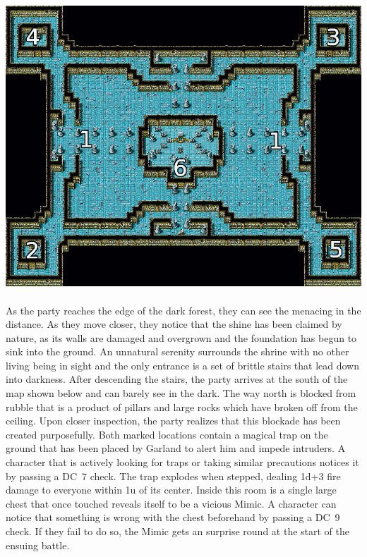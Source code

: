 %
\ofpar
%
\includegraphics[width=\columnwidth]{./art/chaosincornelia/shrine.jpg} 
%
\\\\
%
As the party reaches the edge of the dark forest, they can see the menacing  in the distance.
As they move closer, they notice that the shine has been claimed by nature, as its walls are damaged and overgrown and the foundation has begun to sink into the ground.
An unnatural serenity surrounds the shrine with no other living being in sight and the only entrance is a set of brittle stairs that lead down into darkness. 
After descending the stairs, the party arrives at the south of the map shown below and can barely see in the dark.
The way north is blocked from rubble that is a product of pillars and large rocks which have broken off from the ceiling.
Upon closer inspection, the party realizes that this blockade has been created purposefully.
%
\newpage
%
 Both marked locations contain a magical trap on the ground that has been placed by Garland to alert him and  impede intruders.
A character that is actively looking for traps or taking similar precautions notices it by passing a DC~7 check. 
The trap explodes when stepped, dealing 1d+3 fire damage to everyone within 1u of its center. 
%
\ofpar
%
 Inside this room is a single large chest that once touched reveals itself to be a vicious Mimic.
A character can notice that something is wrong with the chest beforehand by passing a DC~9 check.
If they fail to do so, the Mimic gets an surprise round at the start of the ensuing battle.
